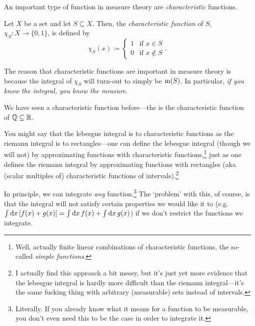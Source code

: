 An important type of function in measure theory are \emph{characteristic} functions.
\begin{dfn}
Let $X$ be a set and let $S\subseteq X$.  Then, the \emph{characteristic function} of $S$, $\chi _S:X\rightarrow \{ 0,1\}$, is defined by
\begin{equation}
\chi _S(x)\coloneqq \begin{cases}1 & \text{if }x\in S \\ 0 & \text{if }x\notin S\end{cases}.
\end{equation}
\begin{rmk}
The reason that characteristic functions are important in measure theory is because the integral of $\chi _S$ will turn-out to simply be $\mathrm{m} (S)$.  In particular, \emph{if you know the integral, you know the measure}.
\end{rmk}
\begin{rmk}
We have seen a characteristic function before---the  is the characteristic function of $\mathbb{Q} \subseteq \mathbb{R}$.
\end{rmk}
\begin{rmk}
You might say that the lebesgue integral is to characteristic functions as the riemann integral is to rectangles---one can define the lebesgue integral (though we will not) by approximating functions with characteristic functions,\footnote{Well, actually finite linear combinations of characteristic functions, the so-called \emph{simple functions}.} just as one defines the riemann integral by approximating functions with rectangles (aka (scalar multiples of) characteristic functions of intervals).\footnote{I actually find this approach a bit messy, but it's just yet more evidence that the lebesgue integral is hardly more difficult than the riemann integral---it's the same fucking thing with arbitrary (measurable) sets instead of intervals.}
\end{rmk}
\end{dfn}
In principle, we can integrate \emph{any} function.\footnote{Literally.  If you already know what it means for a function to be measurable, you don't even need this to be the case in order to integrate it.}  The `problem' with this, of course, is that the integral will not satisfy certain properties we would like it to (e.g.~$\int \mathop{}\!\mathrm{d} x\, [f(x)+g(x)]=\int \mathop{}\!\mathrm{d} x\, f(x)+\int \mathop{}\!\mathrm{d} x\, g(x)$) if we don't restrict the functions we integrate.
